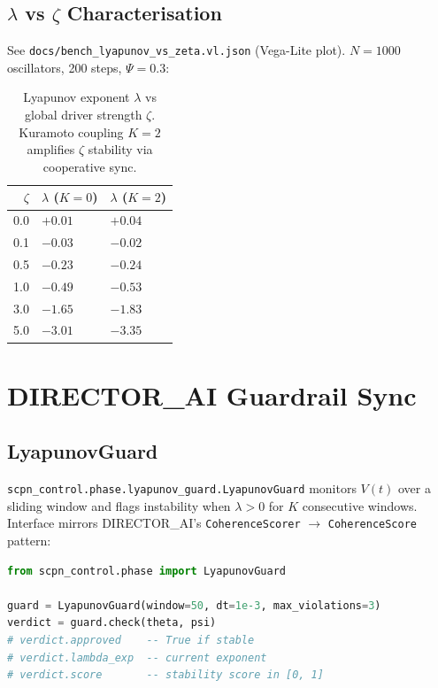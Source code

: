 \documentclass[11pt,a4paper]{article}
\begin{document}
\subsection{$\lambda$ vs $\zeta$ Characterisation}

See \texttt{docs/bench\_lyapunov\_vs\_zeta.vl.json} (Vega-Lite plot).
$N=1000$ oscillators, 200 steps, $\Psi=0.3$:

\begin{table}[h]
\centering
\begin{tabular}{@{}rll@{}}
\toprule
$\zeta$ & $\lambda$ ($K{=}0$) & $\lambda$ ($K{=}2$) \\
\midrule
0.0   & $+0.01$  & $+0.04$ \\
0.1   & $-0.03$  & $-0.02$ \\
0.5   & $-0.23$  & $-0.24$ \\
1.0   & $-0.49$  & $-0.53$ \\
3.0   & $-1.65$  & $-1.83$ \\
5.0   & $-3.01$  & $-3.35$ \\
\bottomrule
\end{tabular}
\caption{Lyapunov exponent $\lambda$ vs global driver strength $\zeta$.
Kuramoto coupling $K=2$ amplifies $\zeta$ stability via cooperative sync.}
\label{tab:lambda_zeta}
\end{table}


\section{DIRECTOR\_AI Guardrail Sync}

\subsection{LyapunovGuard}

\texttt{scpn\_control.phase.lyapunov\_guard.LyapunovGuard} monitors $V(t)$
over a sliding window and flags instability when $\lambda > 0$ for $K$
consecutive windows.  Interface mirrors DIRECTOR\_AI's \texttt{CoherenceScorer}
$\to$ \texttt{CoherenceScore} pattern:

\begin{lstlisting}[language=Python]
from scpn_control.phase import LyapunovGuard

guard = LyapunovGuard(window=50, dt=1e-3, max_violations=3)
verdict = guard.check(theta, psi)
# verdict.approved    -- True if stable
# verdict.lambda_exp  -- current exponent
# verdict.score       -- stability score in [0, 1]
\end{lstlisting}
\end{document}
